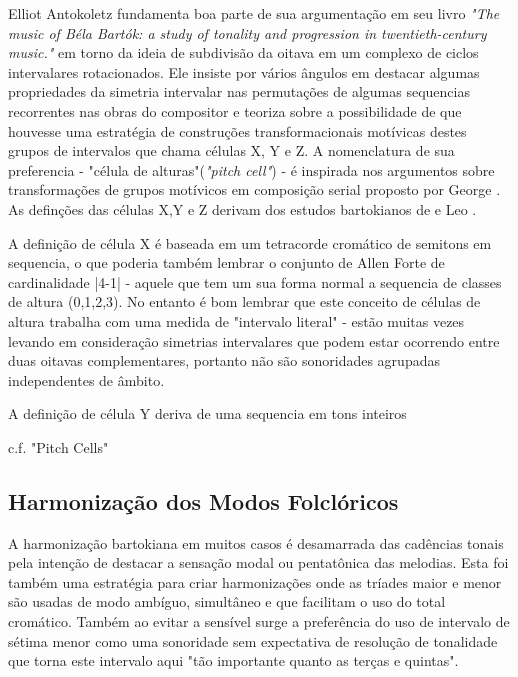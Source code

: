 \documentclass[
	12pt,				%
	openright,			%
	twoside,			%
	a4paper,			%
	english,			%
	french,				%
	spanish,			%
	brazil				%
	]{abntex2}
\begin{document}
Elliot Antokoletz fundamenta boa parte de sua argumentação em seu livro \textit{"The music of Béla Bartók: a study of tonality and progression in twentieth-century music."}\cite{antokoletz1984music} em torno da ideia de subdivisão da oitava em um complexo de ciclos intervalares rotacionados. Ele insiste por vários ângulos em destacar algumas propriedades da simetria intervalar nas permutações de algumas sequencias recorrentes nas obras do compositor e teoriza sobre a possibilidade de que houvesse uma estratégia de construções transformacionais motívicas destes grupos de intervalos que chama células X, Y e Z. A nomenclatura de sua preferencia - "célula de alturas"(\textit{"pitch cell"}) - é inspirada nos argumentos sobre transformações de grupos motívicos em composição serial proposto por George . As definções das células X,Y e Z derivam dos estudos bartokianos de  e Leo .

A definição de célula X é baseada em um tetracorde cromático de semitons em sequencia, o que poderia também lembrar o conjunto de Allen Forte de cardinalidade |4-1| - aquele que tem um sua forma normal a sequencia de classes de altura (0,1,2,3). No entanto é bom lembrar que este conceito de células de altura trabalha com uma medida de "intervalo literal" - estão muitas vezes levando em consideração simetrias intervalares que podem estar ocorrendo entre duas oitavas complementares, portanto não são sonoridades agrupadas independentes de âmbito.

A definição de célula Y deriva de uma sequencia em tons inteiros


c.f. "Pitch Cells"
\cite[p.130]{susanni_antokoletz2012music}



\subsection{Harmonização dos Modos Folclóricos}


A harmonização  bartokiana em muitos casos é desamarrada das cadências tonais pela intenção de destacar a sensação modal ou pentatônica das melodias. Esta foi também uma estratégia para criar harmonizações onde as tríades maior e menor são usadas de modo ambíguo, simultâneo e que facilitam o uso do total cromático. Também ao evitar a sensível surge a preferência do uso de intervalo de sétima menor como uma sonoridade sem expectativa de resolução de tonalidade que torna este intervalo aqui "tão importante quanto as terças e quintas"\cite[p. 28]{antokoletz1984music}.
\end{document}
